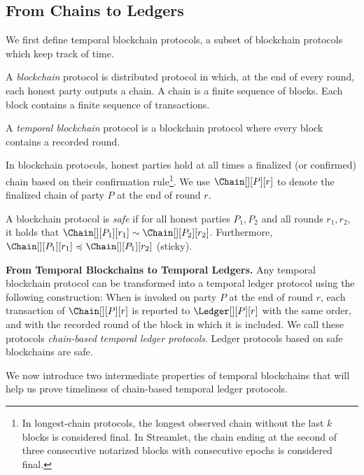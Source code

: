 \subsection{From Chains to Ledgers}

We first define temporal blockchain protocols,
a subset of blockchain protocols which keep track of time.

\begin{definition}
  A \emph{blockchain} protocol is distributed protocol
  in which, at the end of every round, each honest party outputs
  a chain. A chain is a finite sequence of blocks. Each block
  contains a finite sequence of transactions.

  A \emph{temporal blockchain} protocol is a blockchain protocol
  where every block contains a recorded round.
\end{definition}

In blockchain protocols, honest parties hold at all times a finalized (or confirmed) chain
based on their confirmation rule\footnote{
  In longest-chain protocols, the longest observed chain without the last $k$ blocks
  is considered final.
  In Streamlet, the chain ending at the second of three consecutive notarized
  blocks with consecutive epochs is considered final.
}.
We use $\Chain[][P][r]$ to denote the finalized chain
of party $P$ at the end of round $r$.

\begin{definition}
  A blockchain protocol is \emph{safe} if for
  all honest parties $P_1, P_2$ and all rounds $r_1, r_2$,
  it holds that $\Chain[][P_1][r_1] \sim \Chain[][P_2][r_2]$.
  Furthermore, $\Chain[][P_1][r_1] \preccurlyeq \Chain[][P_1][r_2]$ (sticky).
\end{definition}

\noindent
\textbf{From Temporal Blockchains to Temporal Ledgers.}
Any temporal blockchain protocol can be transformed into a
temporal ledger protocol using the following construction:
When \rread is invoked on party $P$ at the end of round $r$, each transaction of
$\Chain[][P][r]$ is reported to $\Ledger[][P][r]$ with the same order, and with
the recorded round of the block in which it is included.
We call these protocols \emph{chain-based temporal ledger protocols}.
Ledger protocols based on safe blockchains are safe.

We now introduce two intermediate properties of temporal blockchains
that will help us prove timeliness of
chain-based temporal ledger protocols.

